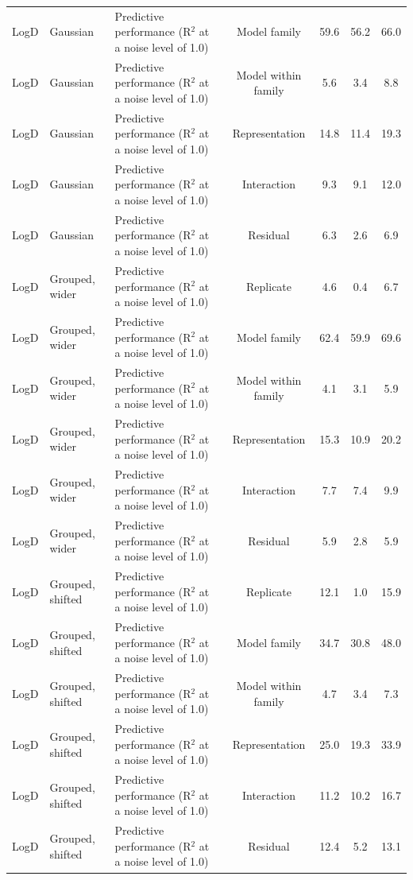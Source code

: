 \begin{landscape}
{\begin{longtable}{lllcccc}
LogD & Gaussian & Predictive performance (R$^2$ at a noise level of 1.0) & Model family & 59.6 & 56.2 & 66.0 \\
LogD & Gaussian & Predictive performance (R$^2$ at a noise level of 1.0) & Model within family & 5.6 & 3.4 & 8.8 \\
LogD & Gaussian & Predictive performance (R$^2$ at a noise level of 1.0) & Representation & 14.8 & 11.4 & 19.3 \\
LogD & Gaussian & Predictive performance (R$^2$ at a noise level of 1.0) & Interaction & 9.3 & 9.1 & 12.0 \\
LogD & Gaussian & Predictive performance (R$^2$ at a noise level of 1.0) & Residual & 6.3 & 2.6 & 6.9 \\
LogD & Grouped, wider & Predictive performance (R$^2$ at a noise level of 1.0) & Replicate & 4.6 & 0.4 & 6.7 \\
LogD & Grouped, wider & Predictive performance (R$^2$ at a noise level of 1.0) & Model family & 62.4 & 59.9 & 69.6 \\
LogD & Grouped, wider & Predictive performance (R$^2$ at a noise level of 1.0) & Model within family & 4.1 & 3.1 & 5.9 \\
LogD & Grouped, wider & Predictive performance (R$^2$ at a noise level of 1.0) & Representation & 15.3 & 10.9 & 20.2 \\
LogD & Grouped, wider & Predictive performance (R$^2$ at a noise level of 1.0) & Interaction & 7.7 & 7.4 & 9.9 \\
LogD & Grouped, wider & Predictive performance (R$^2$ at a noise level of 1.0) & Residual & 5.9 & 2.8 & 5.9 \\
LogD & Grouped, shifted & Predictive performance (R$^2$ at a noise level of 1.0) & Replicate & 12.1 & 1.0 & 15.9 \\
LogD & Grouped, shifted & Predictive performance (R$^2$ at a noise level of 1.0) & Model family & 34.7 & 30.8 & 48.0 \\
LogD & Grouped, shifted & Predictive performance (R$^2$ at a noise level of 1.0) & Model within family & 4.7 & 3.4 & 7.3 \\
LogD & Grouped, shifted & Predictive performance (R$^2$ at a noise level of 1.0) & Representation & 25.0 & 19.3 & 33.9 \\
LogD & Grouped, shifted & Predictive performance (R$^2$ at a noise level of 1.0) & Interaction & 11.2 & 10.2 & 16.7 \\
LogD & Grouped, shifted & Predictive performance (R$^2$ at a noise level of 1.0) & Residual & 12.4 & 5.2 & 13.1 \\

\end{longtable}}
\end{landscape}
